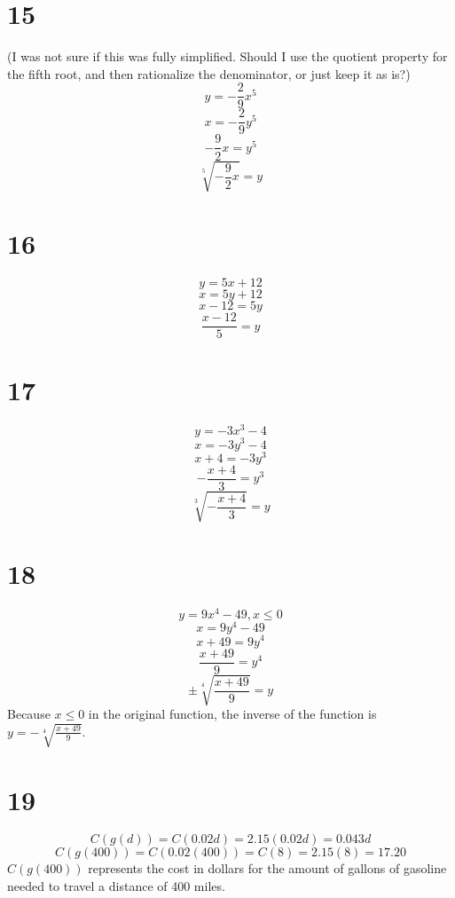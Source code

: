 \documentclass{article}
\theoremstyle{definition}
\begin{document}
\section*{15}
(I was not sure if this was fully simplified. Should I use the quotient property for the fifth root, and then rationalize the denominator, 
or just keep it as is?)
\[ y=-\frac{2}{9}x^5 \]
\[ x=-\frac{2}{9}y^5 \]
\[ -\frac{9}{2}x=y^5 \]
\[ \sqrt[5]{-\frac{9}{2}x}=y \]

\section*{16}
\[ y=5x+12 \]
\[ x=5y+12 \]
\[ x-12=5y \]
\[ \frac{x-12}{5}=y \]

\section*{17}
\[ y=-3x^3-4 \]
\[ x=-3y^3-4 \]
\[ x+4=-3y^3 \]
\[ -\frac{x+4}{3}=y^3 \]
\[ \sqrt[3]{-\frac{x+4}{3}}=y \]

\section*{18}
\[ y=9x^4-49,x\le 0 \]
\[ x=9y^4-49 \]
\[ x+49=9y^4 \]
\[ \frac{x+49}{9}=y^4 \]
\[ \pm\sqrt[4]{\frac{x+49}{9}}=y \]
Because $x\le 0$ in the original function, the inverse of the function is $y=-\sqrt[4]{\frac{x+49}{9}}$.

\section*{19}
\[ C(g(d))=C(0.02d)=2.15(0.02d)=0.043d \]
\[ C(g(400))=C(0.02(400))=C(8)=2.15(8)=17.20 \]
$C(g(400))$ represents the cost in dollars for the amount of gallons of gasoline needed to travel a distance of 400 miles.
\end{document}
